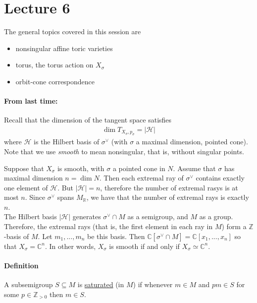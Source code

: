 \documentclass[a4paper,12pt]{amsart}
\newcommand{\ZZ}{\mathbb{Z}}
\newcommand{\RR}{\mathbb{R}}
\newcommand{\CC}{\mathbb{C}}
\begin{document}
\newpage
\section{Lecture 6}

The general topics covered in this session are
\begin{itemize}
\item nonsingular affine toric varieties
\item torus, the torus action on $X_\sigma$
\item orbit-cone correspondence 
\end{itemize}

\paragraph{From last time:}
Recall that the dimension of the tangent space satisfies
\begin{align*}
	\dim T_{X_\sigma, p_\sigma} = | \mathcal{H} |
\end{align*}
where $\mathcal{H}$ is the Hilbert basis of $\sigma^\vee$ (with $\sigma$ a maximal dimension, pointed cone). Note that we use \textit{smooth} to mean nonsingular, that is, without singular points. 

Suppose that $X_\sigma$ is smooth, with $\sigma$ a pointed cone in $N$. Assume that $\sigma$ has maximal dimension $n = \dim N$. Then each extremal ray of $\sigma^\vee$ contains exactly one element of $\mathcal{H}$.	But $|\mathcal{H}| = n$, therefore the number of extremal rasys is at most $n$. Since $\sigma^\vee$ spans $M_\RR$, we have that the number of extremal rays is exactly $n$.  \\

The Hilbert basis $|\mathcal{H}|$ generates $\sigma^\vee \cap M$ as a semigroup, and $M$ as a group. Therefore, the extremal rays (that is, the first element in each ray in $M$) form a $\ZZ$-basis of $M$. Let $m_1, ..., m_n$ be this basis. Then $\CC[\sigma^\vee \cap M] = \CC[x_1, ..., x_n]$ so that $X_\sigma = \CC^n$. In other words, $X_\sigma$ is smooth if and only if $X_\sigma \simeq \CC^n$.

\paragraph{Definition}
A subsemigroup $S \subseteq M$ is \underline{saturated} (in $M$) if whenever $m \in M$ and $pm \in S$ for some $p \in \ZZ_{> 0}$ then $m \in S$.
\end{document}
